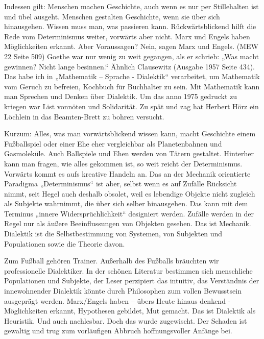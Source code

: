 \documentclass[11pt,a4paper]{article}
\begin{document}
Indessen gilt: Menschen machen Geschichte, auch wenn es nur per Stillehalten
ist und übel ausgeht. Menschen gestalten Geschichte, wenn sie über sich
hinausgehen. Wissen muss man, was passieren kann. Rückwärtsblickend hilft die
Rede vom Determinismus weiter, vorwärts aber nicht. Marx und Engels haben
Möglichkeiten erkannt. Aber Voraussagen? Nein, sagen Marx und Engels. (MEW 22
Seite 509) Goethe war nur wenig zu weit gegangen, als er schrieb: „Was macht
gewinnen? Nicht lange besinnen.“ Ähnlich Clausewitz (Ausgabe 1957 Seite 434).
Das habe ich in „Mathematik – Sprache - Dialektik“ verarbeitet, um Mathematik
vom Geruch zu befreien, Kochbuch für Buchhalter zu sein. Mit Mathematik kann
man Sprechen und Denken über Dialektik. Um das anno 1975 gedruckt zu kriegen
war List vonnöten und Solidarität. Zu spät und zag hat Herbert Hörz ein
Löchlein in das Beamten-Brett zu bohren versucht.

Kurzum: Alles, was man vorwärtsblickend wissen kann, macht Geschichte einem
Fußballspiel oder einer Ehe eher vergleichbar als Planetenbahnen und
Gasmoleküle. Auch Ballspiele und Ehen werden von Tätern gestaltet. Hinterher
kann man fragen, wie alles gekommen ist, so weit reicht der Determinismus.
Vorwärts kommt es aufs kreative Handeln an. Das an der Mechanik orientierte
Paradigma „Determinismus“ ist aber, selbst wenn es auf Zufälle Rücksicht
nimmt, seit Hegel auch deshalb obsolet, weil es lebendige Objekte nicht
zugleich als Subjekte wahrnimmt, die über sich selber hinausgehen. Das kann
mit dem Terminus „innere Widersprüchlichkeit“ designiert werden. Zufälle
werden in der Regel nur als äußere Beeinflussungen von Objekten gesehen. Das
ist Mechanik. Dialektik ist die Selbstbestimmung von Systemen, von Subjekten
und Populationen sowie die Theorie davon.

Zum Fußball gehören Trainer. Außerhalb des Fußballs bräuchten wir
professionelle Dialektiker. In der schönen Literatur bestimmen sich
menschliche Populationen und Subjekte, der Leser perzipiert das intuitiv, das
Verständnis der innewohnender Dialektik könnte durch Philosophen zum vollen
Bewusstsein ausgeprägt werden. Marx/Engels haben – übers Heute hinaus denkend
- Möglichkeiten erkannt, Hypothesen gebildet, Mut gemacht. Das ist Dialektik
als Heuristik. Und auch nachlesbar. Doch das wurde zugewischt. Der Schaden ist
gewaltig und trug zum vorläufigen Abbruch hoffnungsvoller Anfänge bei.
\end{document}
